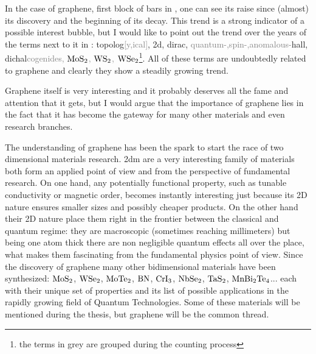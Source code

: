 In the case of graphene, first block of bars in , one can see its raise since (almost) its discovery and the beginning of its decay. This trend is a strong indicator of a possible interest bubble, but I would like to point out the trend over the years of the terms next to it in : topolog\textcolor{gray}{[y,ical]}, 2d, dirac, \textcolor{gray}{quantum-,spin-,anomalous-}hall, dichal\textcolor{gray}{cogenides, $\ce{MoS2}$, $\ce{WS2}$, $\ce{WSe2}$}\footnote{the terms in grey are grouped during the counting process}.
All of these terms are undoubtedly related to graphene and clearly they show a steadily growing trend.
\medskip

Graphene itself is very interesting and it probably deserves all the fame and attention that it gets, but I would argue that the importance of graphene lies in the fact that it has become the gateway for many other materials and even research branches.

The understanding of graphene has been the spark to start the race of two dimensional materials research. \ac{2dm} are a very interesting family of materials both form an applied point of view and from the perspective of fundamental research.
On one hand, any potentially functional property, such as tunable conductivity or magnetic order, becomes instantly interesting just because its 2D nature ensures smaller sizes and possibly cheaper products.
On the other hand their 2D nature place them right in the frontier between the classical and quantum regime: they are macroscopic (sometimes reaching millimeters) but being one atom thick there are non negligible quantum effects all over the place, what makes them fascinating from the fundamental physics point of view.
Since the discovery of graphene many other bidimensional materials have been synthesized: $\ce{MoS2}$, $\ce{WSe2}$, $\ce{MoTe2}$, $\ce{BN}$, $\ce{CrI3}$, $\ce{NbSe2}$, $\ce{TaS2}$, $\ce{MnBi2Te4}$... each with their unique set of properties and its list of possible applications in the rapidly growing field of Quantum Technologies. %
Some of these materials will be mentioned during the thesis, but graphene will be the common thread. %



